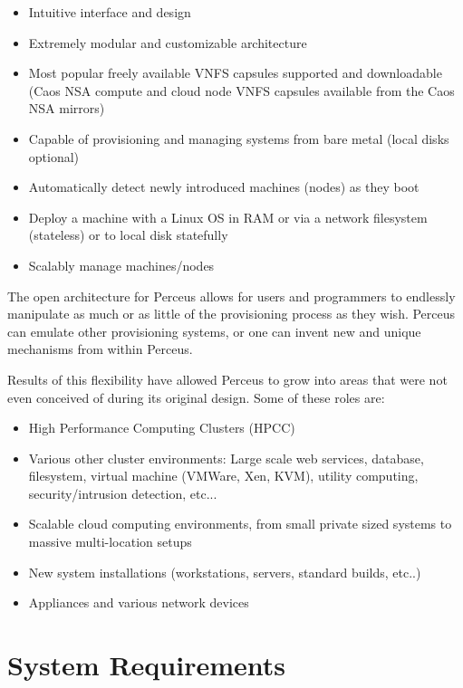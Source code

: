 \documentclass[10pt,letterpaper]{report}
\begin{document}
\begin{itemize}

\item Intuitive interface and design
\item Extremely modular and customizable architecture
\item Most popular freely available VNFS capsules supported and downloadable 
(Caos NSA compute and cloud node VNFS capsules available from the Caos NSA mirrors)
\item Capable of provisioning and managing systems from bare metal (local
disks optional)
\item Automatically detect newly introduced machines (nodes) as they boot
\item Deploy a machine with a Linux OS in RAM or via a network filesystem 
(stateless) or to local disk statefully
\item Scalably manage machines/nodes

\end{itemize}

The open architecture for Perceus allows for users and programmers to endlessly
manipulate as much or as little of the provisioning process as they wish.
Perceus can emulate other provisioning systems, or one can invent new and
unique mechanisms from within Perceus.

Results of this flexibility have allowed Perceus to grow into areas that were
not even conceived of during its original design.  Some of these roles are:

\begin{itemize}

\item High Performance Computing Clusters (HPCC)
\item Various other cluster environments: Large scale web services, database,
filesystem, virtual machine (VMWare, Xen, KVM), utility computing,
security/intrusion detection, etc...
\item Scalable cloud computing environments, from small private sized systems
to massive multi-location setups
\item New system installations (workstations, servers, standard builds, etc..)
\item Appliances and various network devices

\end{itemize}


\section{System Requirements}
\end{document}
